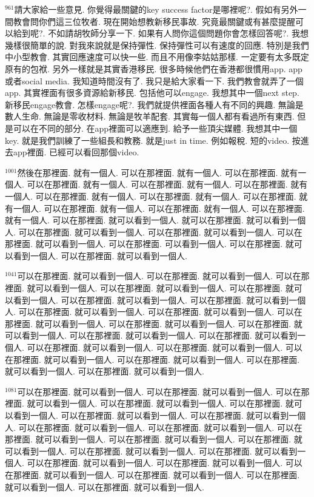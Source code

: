 \documentclass{book}
\begin{document}
$^{961}$請大家給一些意見.
你覺得最關鍵的key success factor是哪裡呢?.
假如有另外一間教會問你們這三位牧者.
現在開始想教新移民事故.
究竟最關鍵或有甚麼提醒可以給到呢?.
不如請胡牧師分享一下.
如果有人問你這個問題你會怎樣回答呢?.
我想幾樣很簡單的說.
對我來說就是保持彈性.
保持彈性可以有速度的回應.
特別是我們中小型教會.
其實回應速度可以快一些.
而且不用像李姑姑那樣.
一定要有太多既定原有的包袱.
另外一樣就是其實香港移民.
很多時候他們在香港都很慣用app.
app或者social media.
我知道時間沒有了.
我只是給大家看一下.
我們教會就弄了一個app.
其實裡面有很多資源給新移民.
包括他可以engage.
我想其中一個next step.
新移民engage教會.
怎樣engage呢?.
我們就提供裡面各種人有不同的興趣.
無論是數人生命.
無論是零收材料.
無論是牧羊配套.
其實每一個人都有看過所有東西.
但是可以在不同的部分.
在app裡面可以適應到.
給予一些頂尖媒體.
我想其中一個key.
就是我們訓練了一些組長和教務.
就是just in time.
例如報稅.
短的video.
按進去app裡面.
已經可以看回那個video.

$^{1001}$然後在那裡面.
就有一個人.
可以在那裡面.
就有一個人.
可以在那裡面.
就有一個人.
可以在那裡面.
就有一個人.
可以在那裡面.
就有一個人.
可以在那裡面.
就有一個人.
可以在那裡面.
就有一個人.
可以在那裡面.
就有一個人.
可以在那裡面.
就有一個人.
可以在那裡面.
就有一個人.
可以在那裡面.
就有一個人.
可以在那裡面.
就有一個人.
可以在那裡面.
就可以看到一個人.
就可以在那裡面.
就可以看到一個人.
可以在那裡面.
就可以看到一個人.
可以在那裡面.
就可以看到一個人.
可以在那裡面.
就可以看到一個人.
可以在那裡面.
可以看到一個人.
可以在那裡面.
就可以看到一個人.
可以在那裡面.
就可以看到一個人.

$^{1041}$可以在那裡面.
就可以看到一個人.
可以在那裡面.
就可以看到一個人.
可以在那裡面.
就可以看到一個人.
可以在那裡面.
就可以看到一個人.
可以在那裡面.
就可以看到一個人.
可以在那裡面.
就可以看到一個人.
可以在那裡面.
就可以看到一個人.
可以在那裡面.
就可以看到一個人.
可以在那裡面.
就可以看到一個人.
可以在那裡面.
就可以看到一個人.
可以在那裡面.
就可以看到一個人.
可以在那裡面.
就可以看到一個人.
可以在那裡面.
就可以看到一個人.
可以在那裡面.
就可以看到一個人.
可以在那裡面.
就可以看到一個人.
可以在那裡面.
就可以看到一個人.
可以在那裡面.
就可以看到一個人.
可以在那裡面.
就可以看到一個人.
可以在那裡面.
就可以看到一個人.
可以在那裡面.
就可以看到一個人.

$^{1081}$可以在那裡面.
就可以看到一個人.
可以在那裡面.
就可以看到一個人.
可以在那裡面.
就可以看到一個人.
可以在那裡面.
就可以看到一個人.
可以在那裡面.
就可以看到一個人.
可以在那裡面.
就可以看到一個人.
可以在那裡面.
就可以看到一個人.
可以在那裡面.
就可以看到一個人.
可以在那裡面.
就可以看到一個人.
可以在那裡面.
就可以看到一個人.
可以在那裡面.
就可以看到一個人.
可以在那裡面.
就可以看到一個人.
可以在那裡面.
就可以看到一個人.
可以在那裡面.
就可以看到一個人.
可以在那裡面.
就可以看到一個人.
可以在那裡面.
就可以看到一個人.
可以在那裡面.
就可以看到一個人.
可以在那裡面.
就可以看到一個人.
可以在那裡面.
就可以看到一個人.
可以在那裡面.
就可以看到一個人.
\end{document}

